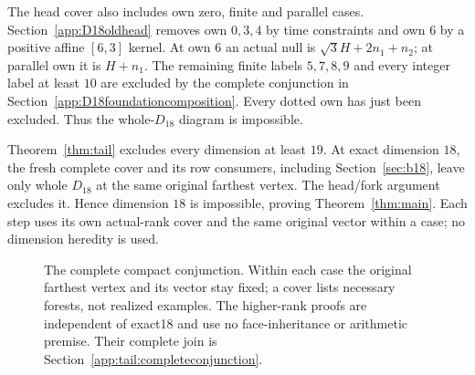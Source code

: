 \documentclass[11pt]{article}
\theoremstyle{definition}
\theoremstyle{remark}
\begin{document}
The head cover also includes own zero, finite and parallel
cases. Section~\ref{app:D18oldhead} removes own
\(0,3,4\) by time constraints and own \(6\) by a positive
affine \([6,3]\) kernel. At own \(6\) an actual null is
\(\sqrt3H+2n_1+n_2\); at parallel own it is \(H+n_1\).
The remaining finite labels \(5,7,8,9\) and every integer
label at least \(10\) are excluded by the complete conjunction in
Section~\ref{app:D18foundationcomposition}. Every dotted own has just been excluded.
Thus the whole-\(D_{18}\) diagram is impossible.

Theorem~\ref{thm:tail} excludes every dimension at least \(19\).
At exact dimension \(18\), the fresh complete cover and its
row consumers, including Section~\ref{sec:b18}, leave only
whole \(D_{18}\) at the same original farthest vertex.
The head/fork argument excludes it. Hence dimension \(18\)
is impossible, proving Theorem~\ref{thm:main}. Each step uses its
own actual-rank cover and the same original vector within a case;
no dimension heredity is used.

\begin{figure}[tbp]
\centering
{}
\caption{The complete compact conjunction. Within each case the original
farthest vertex and its vector stay fixed; a cover lists necessary forests,
not realized examples. The higher-rank proofs are independent of exact18
and use no face-inheritance or arithmetic premise. Their complete join is
Section~\ref{app:tail:completeconjunction}.}
\label{fig:ill20261026:c17:conjunction}
\end{figure}
\end{document}
